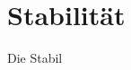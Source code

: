 \documentclass[../main.tex]{subfiles}
\begin{document}
\section{Stabilität}
Die Stabil
\end{document}
